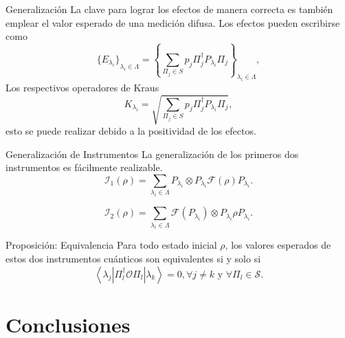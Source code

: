 \documentclass[svgnames,12pt,aspectratio=149]{beamer}
\newcommand{\tensor}{\otimes}
\newcommand{\fuzzy}[1]{\mathcal{F}\left(#1\right)}
\newcommand{\permutdagger}[2]{\Pi_{#1}^{\dagger}#2\Pi_{#1}}
\begin{document}
\begin{frame}{Generalización}
  La clave para lograr los efectos de manera correcta es también emplear el valor esperado de una medición difusa. Los efectos pueden escribirse como
  \begin{equation*}
      {\{E_{\lambda_i}\}}_{\lambda_i \in \Lambda}={\left\{\sum_{\Pi_j \in S} p_j \permutdagger{j}{P_{\lambda_i}}\right\}}_{\lambda_i \in \Lambda},
  \end{equation*}  
  Los respectivos operadores de Kraus 
  \begin{equation*}
     K_{\lambda_i}=\sqrt{\sum_{\Pi_j \in S} p_j \permutdagger{j}{P_{\lambda_i} }},
  \end{equation*} 
  esto se puede realizar debido a la positividad de los efectos.
\end{frame}


\begin{frame}{Generalización de Instrumentos}
  La generalización de los primeros dos instrumentos es fácilmente realizable.
\begin{equation*}
    \mathcal{I}_1(\rho)=\sum_{\lambda_i \in \Lambda }P_{\lambda_i}\otimes P_{\lambda_i}\fuzzy{\rho}P_{\lambda_i}.
\end{equation*} 

\begin{equation*}
  \mathcal{I}_2(\rho)= \sum_{\lambda_i \in \Lambda } \fuzzy{P_{\lambda_i}}\tensor P_{\lambda_i}\rho P_{\lambda_i}.
\end{equation*} 

\begin{block}{Proposición: Equivalencia}
  Para todo estado inicial $\rho$, los valores esperados de estos dos instrumentos
cuánticos son equivalentes si y solo si \[\left \langle \lambda_j \left|\Pi_l^\dagger
\mathcal{O} \Pi_l\right|\lambda_k\right\rangle=0,\forall j\ne k \text{ y }
\forall \Pi_l \in \mathcal{S}.\]
\end{block} 




\end{frame}




\section{Conclusiones}
\end{document}
